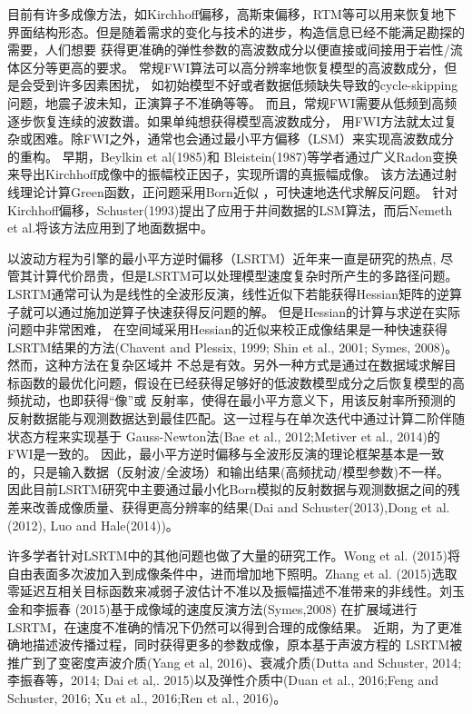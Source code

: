 目前有许多成像方法，如Kirchhoff偏移，高斯束偏移，RTM等可以用来恢复地下界面结构形态。但是随着需求的变化与技术的进步，构造信息已经不能满足勘探的需要，人们想要
获得更准确的弹性参数的高波数成分以便直接或间接用于岩性/流体区分等更高的要求。
常规FWI算法可以高分辨率地恢复模型的高波数成分，但是会受到许多因素困扰，
如初始模型不好或者数据低频缺失导致的cycle-skipping问题，地震子波未知，正演算子不准确等等。
而且，常规FWI需要从低频到高频逐步恢复连续的波数谱。如果单纯想获得模型高波数成分，
用FWI方法就太过复杂或困难。除FWI之外，通常也会通过最小平方偏移（LSM）来实现高波数成分的重构。
早期，Beylkin
et al(1985)\cite{BeylkinEtAl1985}和
Bleistein(1987)\cite{Bleistein1987}等学者通过广义Radon变换来导出Kirchhoff成像中的振幅校正因子，实现所谓的真振幅成像。
该方法通过射线理论计算Green函数，正问题采用Born近似
，可快速地迭代求解反问题。
针对Kirchhoff偏移，Schuster(1993)\cite{Schuster1993}提出了应用于井间数据的LSM算法，而后Nemeth et al.\cite{Nemeth1999}将该方法应用到了地面数据中。

以波动方程为引擎的最小平方逆时偏移（LSRTM）近年来一直是研究的热点,
尽管其计算代价昂贵，但是LSRTM可以处理模型速度复杂时所产生的多路径问题。
LSRTM通常可认为是线性的全波形反演，线性近似下若能获得Hessian矩阵的逆算子就可以通过施加逆算子快速获得反问题的解。
但是Hessian的计算与求逆在实际问题中非常困难，
在空间域采用Hessian的近似来校正成像结果是一种快速获得LSRTM结果的方法(Chavent and Plessix, 
1999\cite{ChaventEtAl1999}; Shin et al., 2001\cite{shin2001improved}; Symes,
2008\cite{Symes2008})。然而，这种方法在复杂区域并
不总是有效。另外一种方式是通过在数据域求解目标函数的最优化问题，假设在已经获得足够好的低波数模型成分之后恢复模型的高频扰动，也即获得“像”或
反射率，使得在最小平方意义下，用该反射率所预测的反射数据能与观测数据达到最佳匹配。这一过程与在单次迭代中通过计算二阶伴随状态方程来实现基于
Gauss-Newton法(Bae et al., 2012\cite{bae2012frequency};Metiver et al.,
2014\cite{Metivier2014})的FWI是一致的。
因此，最小平方逆时偏移与全波形反演的理论框架基本是一致的，只是输入数据（反射波/全波场）和输出结果(高频扰动/模型参数)不一样。
因此目前LSRTM研究中主要通过最小化Born模拟的反射数据与观测数据之间的残差来改善成像质量、获得更高分辨率的结果(Dai and
Schuster(2013)\cite{Dai2013},Dong et al.(2012)\cite{Dong2012}, Luo and
Hale(2014)\cite{Luo2014})。

许多学者针对LSRTM中的其他问题也做了大量的研究工作。Wong et al.
(2015)\cite{WongEtAl2015}将自由表面多次波加入到成像条件中，进而增加地下照明。Zhang et al.
(2015)\cite{ZhangEtAl2015}选取零延迟互相关目标函数来减弱子波估计不准以及振幅描述不准带来的非线性。刘玉金和李振春
(2015)\cite{刘玉金2015}基于成像域的速度反演方法(Symes,2008\cite{Symes2008a})
在扩展域进行LSRTM，在速度不准确的情况下仍然可以得到合理的成像结果。
近期，为了更准确地描述波传播过程，同时获得更多的参数成像，原本基于声波方程的
LSRTM被推广到了变密度声波介质(Yang et al, 2016)\cite{Yang2016}、衰减介质(Dutta and
Schuster, 2014\cite{DuttaEtAl2014}; 李振春等，2014\cite{李振春2014}; Dai et al,.
2015\cite{Dai2015})以及弹性介质中(Duan et al., 2016\cite{Duan2016};Feng and Schuster,
2016\cite{Feng2016}; Xu et al., 2016\cite{Xu2016};Ren et al., 2016\cite{RenEtAl2016})。

